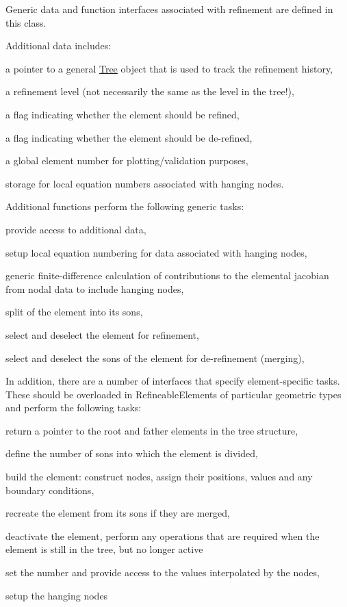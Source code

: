 Generic data and function interfaces associated with refinement are defined in this class.

Additional data includes\+:
\begin{DoxyItemize}
\item a pointer to a general \hyperlink{classoomph_1_1Tree}{Tree} object that is used to track the refinement history,
\item a refinement level (not necessarily the same as the level in the tree!),
\item a flag indicating whether the element should be refined,
\item a flag indicating whether the element should be de-\/refined,
\item a global element number for plotting/validation purposes,
\item storage for local equation numbers associated with hanging nodes.
\end{DoxyItemize}

Additional functions perform the following generic tasks\+:
\begin{DoxyItemize}
\item provide access to additional data,
\item setup local equation numbering for data associated with hanging nodes,
\item generic finite-\/difference calculation of contributions to the elemental jacobian from nodal data to include hanging nodes,
\item split of the element into its sons,
\item select and deselect the element for refinement,
\item select and deselect the sons of the element for de-\/refinement (merging),
\end{DoxyItemize}

In addition, there are a number of interfaces that specify element-\/specific tasks. These should be overloaded in Refineable\+Elements of particular geometric types and perform the following tasks\+:
\begin{DoxyItemize}
\item return a pointer to the root and father elements in the tree structure,
\item define the number of sons into which the element is divided,
\item build the element\+: construct nodes, assign their positions, values and any boundary conditions,
\item recreate the element from its sons if they are merged,
\item deactivate the element, perform any operations that are required when the element is still in the tree, but no longer active
\item set the number and provide access to the values interpolated by the nodes,
\item setup the hanging nodes
\end{DoxyItemize}

